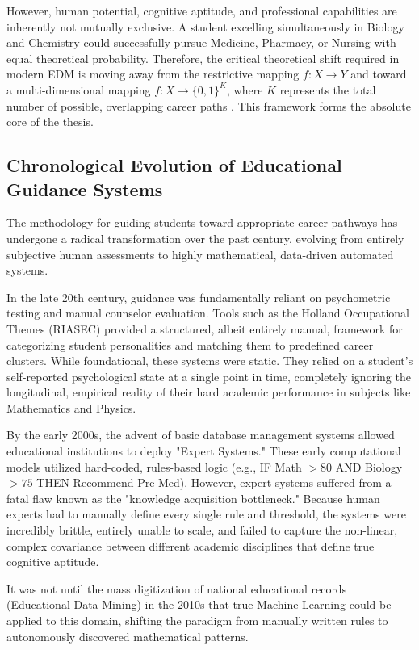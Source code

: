 However, human potential, cognitive aptitude, and professional capabilities are inherently not mutually exclusive. A student excelling simultaneously in Biology and Chemistry could successfully pursue Medicine, Pharmacy, or Nursing with equal theoretical probability. Therefore, the critical theoretical shift required in modern EDM is moving away from the restrictive mapping $f: X \rightarrow Y$ and toward a multi-dimensional mapping $f: X \rightarrow \{0, 1\}^K$, where $K$ represents the total number of possible, overlapping career paths \autocite{baker2014educational}. This framework forms the absolute core of the thesis.

\subsection{Chronological Evolution of Educational Guidance Systems}

The methodology for guiding students toward appropriate career pathways has undergone a radical transformation over the past century, evolving from entirely subjective human assessments to highly mathematical, data-driven automated systems. 

In the late 20th century, guidance was fundamentally reliant on psychometric testing and manual counselor evaluation. Tools such as the Holland Occupational Themes (RIASEC) provided a structured, albeit entirely manual, framework for categorizing student personalities and matching them to predefined career clusters. While foundational, these systems were static. They relied on a student's self-reported psychological state at a single point in time, completely ignoring the longitudinal, empirical reality of their hard academic performance in subjects like Mathematics and Physics.

By the early 2000s, the advent of basic database management systems allowed educational institutions to deploy "Expert Systems." These early computational models utilized hard-coded, rules-based logic (e.g., IF Math $> 80$ AND Biology $> 75$ THEN Recommend Pre-Med). However, expert systems suffered from a fatal flaw known as the "knowledge acquisition bottleneck." Because human experts had to manually define every single rule and threshold, the systems were incredibly brittle, entirely unable to scale, and failed to capture the non-linear, complex covariance between different academic disciplines that define true cognitive aptitude.

It was not until the mass digitization of national educational records (Educational Data Mining) in the 2010s that true Machine Learning could be applied to this domain, shifting the paradigm from manually written rules to autonomously discovered mathematical patterns.

